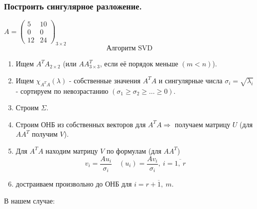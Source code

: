 \documentclass[12pt, letterpaper, twoside]{article}
\begin{document}
\subsubsection*{Построить сингулярное разложение.}
$A = \begin{pmatrix}
    5 & 10\\
    0 & 0\\
    12 & 24
\end{pmatrix}_{3 \times 2}$
\[\text{Алгоритм SVD}\]
\begin{enumerate}
    \item Ищем $A^T A_{2\times 2}$ \big(или $AA^T_{3\times 3}$, если её порядок меньше $(m < n)$\big).
    \item Ищем $\chi_{A^T A}(\lambda)$ - собственные значения $A^T A$ и сингулярные числа $\sigma_i = \sqrt{\lambda_i}$ - сортируем по невозрастанию $(\sigma_1 \geq \sigma_2 \geq\dots \geq 0)$.
    \item Строим $\Sigma$.
    \item Строим ОНБ из собственных векторов для $A^T A\Rightarrow$ получаем матрицу $U$ (для $A A^T$ получим $V$).
    \item Для $A^T A$ находим матрицу $V$ по формулам (для $AA^T$)
    \[v_i = \frac{A u_i}{\sigma_i}\quad (u_i) = \frac{A v_i}{\sigma_i},\ i = \overline{1,\ r}\]
    \item достраиваем произвольно до ОНБ для $i = \overline{r + 1,\ m}$. 
\end{enumerate}
В нашем случае:
\end{document}
